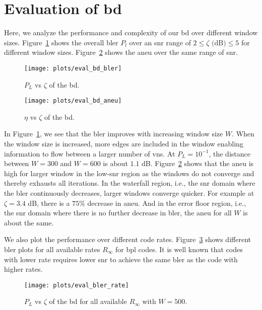 \section{Evaluation of \texorpdfstring{\acrlong{bd}}{BD}}
Here, we analyze the performance and complexity of our \gls{bd} over different window sizes. Figure~\ref{fig:eval_bd_bler} shows the overall \gls{bler} $P_l$ over an \gls{snr} range of $2\leq\zeta\text{ (dB)}\leq 5$ for different window sizes. Figure~\ref{fig:eval_bd_aneu} shows the \gls{aneu} over the same range of \gls{snr}.
\begin{figure}[htbp]
  \centering
  \texttt{[image: plots/eval\_bd\_bler]}
  \caption[\acrshort{bler} vs \acrshort{snr} of the \acrshort{bd} for $W=300$.]{$P_L$ vs $\zeta$ of the \acrfull{bd}.}
  \label{fig:eval_bd_bler}
\end{figure}
\begin{figure}[htbp]
   \centering
  \texttt{[image: plots/eval\_bd\_aneu]}
  \caption[\acrshort{aneu} vs \acrshort{snr} of the \acrshort{bd} for $W=300$.]{$\eta$ vs $\zeta$ of the \acrfull{bd}.}
  \label{fig:eval_bd_aneu}
\end{figure}

In Figure~\ref{fig:eval_bd_bler}, we see that the \gls{bler} improves with increasing window size $W$. When the window size is increased, more edges are included in the window enabling information to flow between a larger number of \glspl{vn}. At $P_L=10^{-1}$, the distance between $W=300$ and $W=600$ is about $1.1$ dB. Figure~\ref{fig:eval_bd_aneu} shows that the \gls{aneu} is high for larger window in the low-\gls{snr} region as the windows do not converge and thereby exhausts all iterations. In the waterfall region, i.e., the \gls{snr} domain where the \gls{bler} continuously decreases, larger windows converge quicker. For example at $\zeta=3.4$ dB, there is a $75\%$ decrease in \gls{aneu}. And in the error floor region, i.e., the \gls{snr} domain where there is no further decrease in \gls{bler}, the \gls{aneu} for all $W$ is about the same.

We also plot the performance over different code rates. Figure~\ref{fig:eval_bler_rate} shows different \gls{bler} plots for all available rates $R_\infty$ for \gls{bpl} codes. It is well known that codes with lower rate requires lower \gls{snr} to achieve the same \gls{bler} as the code with higher rates.
\begin{figure}[htbp]
  \centering
  \texttt{[image: plots/eval\_bler\_rate]}
  \caption[\acrshort{bler} vs \acrshort{snr} of the \acrshort{bd} for all $R_\infty$.]{$P_L$ vs $\zeta$ of the \acrfull{bd} for all available $R_\infty$ with $W=500$.}
  \label{fig:eval_bler_rate}
\end{figure}


